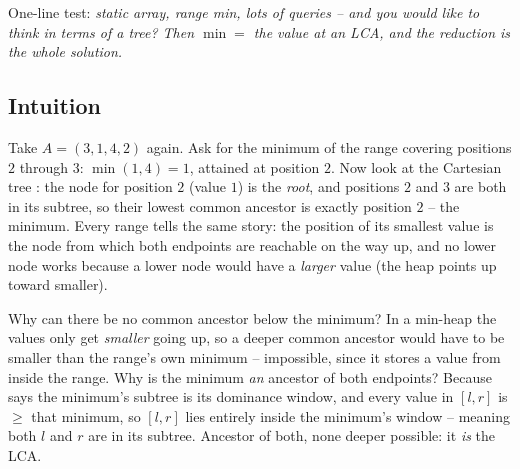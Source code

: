 \begin{recognitionbox}
One-line test: \emph{static array, range min, lots of queries -- and you would like to think in terms of
a tree? Then $\min = $ the value at an LCA, and the reduction is the whole solution.}
\end{recognitionbox}

\subsection{Intuition}

Take $A=(3,1,4,2)$ again. Ask for the minimum of the range covering positions $2$ through $3$: $\min(1,4)=1$,
attained at position $2$. Now look at the Cartesian tree : the node for position $2$
(value $1$) is the \emph{root}, and positions $2$ and $3$ are both in its subtree, so their lowest common
ancestor is exactly position $2$ -- the minimum. Every range tells the same story: the position of its
smallest value is the node from which both endpoints are reachable on the way up, and no lower node works
because a lower node would have a \emph{larger} value (the heap points up toward smaller).

Why can there be no common ancestor below the minimum? In a min-heap the values only get \emph{smaller}
going up, so a deeper common ancestor would have to be smaller than the range's own minimum -- impossible,
since it stores a value from inside the range. Why is the minimum \emph{an} ancestor of both endpoints?
Because  says the minimum's subtree is its dominance window, and every value in $[l,r]$
is $\ge$ that minimum, so $[l,r]$ lies entirely inside the minimum's window -- meaning both $l$ and $r$
are in its subtree. Ancestor of both, none deeper possible: it \emph{is} the LCA.

